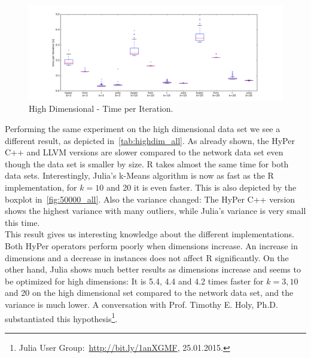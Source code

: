 \begin{figure}[htsb]
  \centerline{
  \includegraphics[scale=0.4, trim="0cm 1cm 0cm 0cm"]{figures/charts/50000_all}
  }
  \caption[High Dimensional - Time per Iteration (Competitors)]{High Dimensional - Time per Iteration.}
  \label{fig:50000_all}
\end{figure}



Performing the same experiment on the high dimensional data set we see a different result, as depicted in~\autoref{tab:highdim_all}. As already shown, the HyPer C++ and LLVM versions are slower compared to the network data set even though the data set is smaller by size. R takes almost the same time for both data sets. Interestingly, Julia’s k-Means algorithm is now as fast as the R implementation, for $k = 10$ and 20 it is even faster. This is also depicted by the boxplot in~\autoref{fig:50000_all}. Also the variance changed: The HyPer C++ version shows the highest variance with many outliers, while Julia's variance is very small this time.   
\\
This result gives us interesting knowledge about the different implementations. Both HyPer operators perform poorly when dimensions increase. An increase in dimensions and a decrease in instances does not affect R significantly. On the other hand, Julia shows much better results as dimensions increase and seems to be optimized for high dimensions: It is 5.4, 4.4 and 4.2 times faster for $k = 3, 10$ and 20 on the high dimensional set compared to the network data set, and the variance is much lower. A conversation with Prof. Timothy E. Holy, Ph.D. substantiated this hypothesis\footnote{Julia User Group:~\url{http://bit.ly/1anXGMF}, 25.01.2015.}. 

